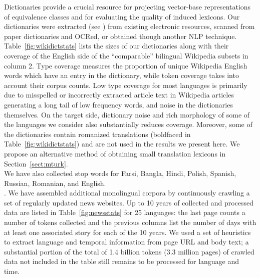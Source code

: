 \documentclass{article}
\newcommand{\mtodo}[1]{}
\newcommand{\secref}[1]{Section~\ref{#1}}
\newcommand{\tabref}[1]{Table~\ref{#1}}
\begin{document}

  Dictionaries provide a crucial resource for projecting vector-base representations of equivalence classes and for evaluating the quality of induced lexicons. Our dictionaries were extracted (see \cite{Schafer:2006}) from existing electronic resources, scanned from paper dictionaries and OCRed, or obtained though another NLP technique. \tabref{fig:wikidictstats} lists the sizes of our dictionaries along with their coverage of the English side of the ``comparable'' bilingual Wikipedia subsets in column 2.  Type coverage measures the proportion of unique Wikipedia English words which have an entry in the dictionary, while token coverage takes into account their corpus counts. Low type coverage for most languages is primarily due to misspelled or incorrectly extracted article text in Wikipedia articles generating a long tail of low frequency words, and noise in the dictionaries themselves.  On the target side, dictionary noise and rich morphology of some of the languages we consider also substantially reduces coverage.  Moreover, some of the dictionaries contain romanized translations (boldfaced in \tabref{fig:wikidictstats}) and are not used in the results we present here.  %
We propose an alternative method of obtaining small translation lexicons in \secref{sect:mturk}.\\ 

 We have also collected stop words for Farsi, Bangla, Hindi, Polish, Spanish, Russian, Romanian, and English.\\

.  We have assembled additional monolingual corpora by continuously crawling a set of regularly updated news websites.  Up to 10 years of collected and processed data are listed in \tabref{fig:newsstats} for 25 languages: the last page counts a number of tokens collected and the previous columns list the number of days with at least one associated story for each of the 10 years.  We used a set of heuristics to extract language and temporal information from page URL and body text; a substantial portion of the total of 1.4 billion tokens (3.3 million pages) of crawled data not included in the table still remains to be processed for language and time.\\
\end{document}
